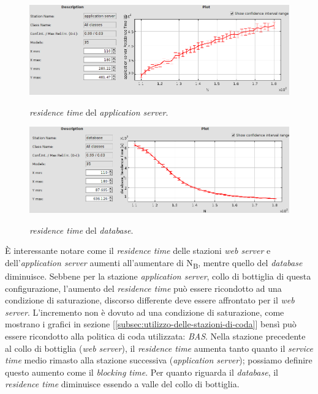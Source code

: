 \documentclass[../main.tex]{subfiles}
\begin{document}
    \begin{figure}[H]
        \centering
        \includegraphics[scale = 0.45]{assets/as_res_1.png}\\
        \caption[\textit{Residence time} del \textit{application server}]{\textit{residence time} del \textit{application server}.}
        \label{fig:residence-time-as}
    \end{figure}

    \begin{figure}[H]
        \centering
        \includegraphics[scale = 0.45]{assets/db_res_1.png}\\
        \caption[\textit{Residence time} del \textit{database}]{\textit{residence time} del \textit{database}.}
        \label{fig:residence-time-db}
    \end{figure}

    È interessante notare come il \textit{residence time} delle stazioni \textit{web server} e dell'\textit{application server}
    aumenti all'aumentare di N\textsubscript{B}, mentre quello del \textit{database} diminuisce.\newline
    Sebbene per la stazione \textit{application server}, collo di bottiglia di questa configurazione, l'aumento del
    \textit{residence time} può essere ricondotto ad una condizione di saturazione, discorso differente deve essere
    affrontato per il \textit{web server}.
    L'incremento non è dovuto ad una condizione di saturazione, come mostrano i grafici in sezione
    [\ref{subsec:utilizzo-delle-stazioni-di-coda}] bensì può essere ricondotto alla politica di coda utilizzata:
    \textit{BAS}. Nella stazione precedente al collo di bottiglia (\textit{web server}), il \textit{residence time}
    aumenta tanto quanto il \textit{service time} medio rimasto alla stazione successiva (\textit{application server});
    possiamo definire questo aumento come il \textit{blocking time}.
    Per quanto riguarda il \textit{database}, il \textit{residence time} diminuisce essendo a valle del collo di
    bottiglia.
\end{document}
